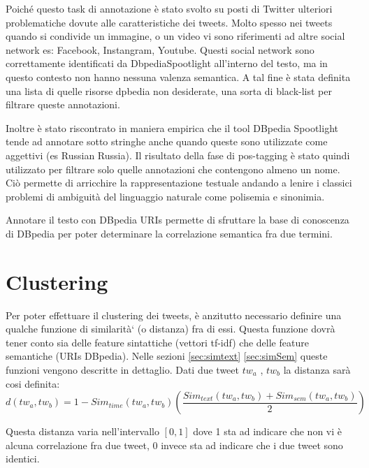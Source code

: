 Poiché questo task di annotazione è stato svolto su posti di Twitter  ulteriori problematiche dovute alle caratteristiche dei tweets.
Molto spesso nei tweets quando si condivide un immagine, o un video vi sono riferimenti ad altre social network es: Facebook, Instangram, Youtube.
Questi social network sono correttamente identificati  da DbpediaSpootlight all'interno del testo, ma in questo contesto non hanno nessuna valenza semantica.  A tal fine è stata definita una lista di quelle risorse dpbedia non desiderate, una sorta di black-list per filtrare queste annotazioni.


Inoltre è stato riscontrato in maniera empirica che il tool DBpedia Spootlight tende ad annotare  sotto stringhe anche quando queste sono utilizzate come aggettivi (es Russian   Russia).
Il risultato della fase di pos-tagging è stato quindi utilizzato per filtrare solo quelle annotazioni che contengono almeno un nome. 
Ciò permette di arricchire la rappresentazione testuale andando a lenire i classici problemi di ambiguità del linguaggio naturale come polisemia e sinonimia.  

Annotare il testo con DBpedia URIs permette di sfruttare la base di conoscenza di DBpedia per poter determinare la correlazione semantica fra due termini. 


 
 

 


 


  
 
\section{Clustering}
Per poter effettuare il clustering dei tweets, è anzitutto necessario definire
una qualche funzione di similarità` (o distanza) fra di essi. Questa funzione
dovrà tener conto sia delle feature sintattiche (vettori tf-idf) che delle feature semantiche (URIs DBpedia). Nelle sezioni \ref{sec:simtext} \ref{sec:simSem} queste funzioni vengono descritte in dettaglio. 
Dati due tweet $tw_a$ , $tw_b$ la distanza sarà cosi
definita:
\begin{equation}
\label{eq:distanceTweet}
d(tw_a,tw_b)=1-Sim_{time}(tw_a,tw_b)\left(\frac{Sim_{text}(tw_a,tw_b)+Sim_{sem}(tw_a,tw_b)}{2}\right)
\end{equation}

Questa distanza varia nell'intervallo $[0, 1]$ dove 1 sta ad indicare che non vi è alcuna correlazione fra due tweet, 0 invece sta ad indicare che i due tweet sono identici.

